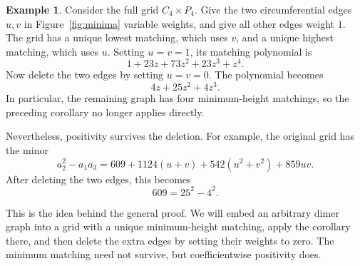 \documentclass[11pt]{article}
\theoremstyle{definition}
\newtheorem{example}[theorem]{Example}
\theoremstyle{remark}
\begin{document}
\begin{example}

Consider the full grid $C_4\times P_4$. Give the two
circumferential edges $u,v$ in Figure~\ref{fig:minima}
variable weights, and give all other edges weight $1$.
The grid has a unique lowest matching, which uses $v$,
and a unique highest matching, which uses $u$.
Setting $u=v=1$, its matching polynomial is
\[
1+23z+73z^2+23z^3+z^4.
\]
Now delete the two edges by setting $u=v=0$.
The polynomial becomes
\[
4z+25z^2+4z^3.
\]
In particular, the remaining graph has four
minimum-height matchings, so the preceding corollary
no longer applies directly.

Nevertheless, positivity survives the deletion.
For example, the original grid has the minor
\[
a_2^2-a_1a_3
=609+1124(u+v)+542(u^2+v^2)+859uv.
\]
After deleting the two edges, this becomes
\[
609=25^2-4^2.
\]

This is the idea behind the general proof. We will
embed an arbitrary dimer graph into a grid with a
unique minimum-height matching, apply the corollary
there, and then delete the extra edges by setting
their weights to zero. The minimum matching need
not survive, but coefficientwise positivity does.
\end{example}
\end{document}
